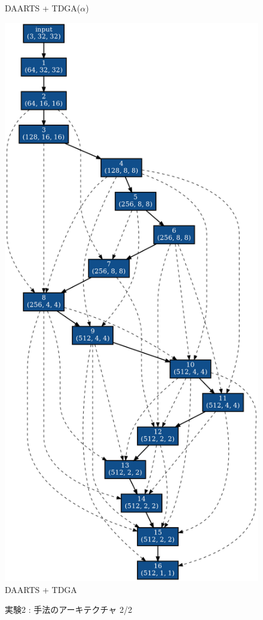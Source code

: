 \begin{figure}[tb]
\begin{minipage}{0.5\hsize}
\begin{center}
    DAARTS + TDGA($\alpha$)
 	\end{center}
 \end{minipage}
 \begin{minipage}{0.5\hsize}
 	\begin{center}
    \includegraphics[clip,scale=0.2]{./fig/04.exp/noevo_last.png}\\
    DAARTS + TDGA
 	\end{center}
 \end{minipage}
 \caption{実験2 : 手法のアーキテクチャ 2/2}
 \label{fig:exp2/archi2}
\end{figure}

